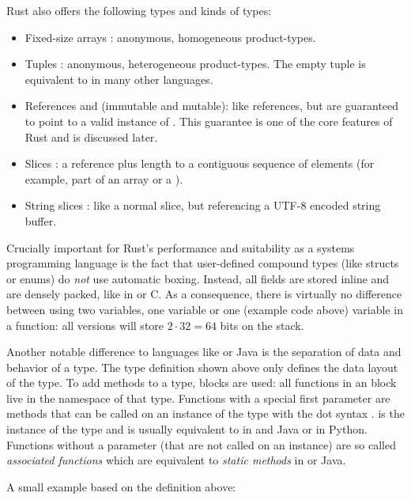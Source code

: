 \newpage
Rust also offers the following types and kinds of types:
\vspace{-3mm}
\begin{itemize}
  \item Fixed-size arrays \code{[T; N]}: anonymous, homogeneous product-types.
  \item Tuples : anonymous, heterogeneous product-types. The empty tuple \code{()} is equivalent to  in many other languages.
  \item References  and  (immutable and mutable): like \cpp references, but are guaranteed to point to a valid instance of .
  This guarantee is one of the core features of Rust and is discussed later.
  \item Slices \code{&[T]}: a reference plus length to a contiguous sequence of elements (for example, part of an array or a ).
  \item String slices : like a normal slice, but referencing a UTF-8 encoded string buffer.
\end{itemize}

Crucially important for Rust's performance and suitability as a systems programming language is the fact that user-defined compound types (like structs or enums) do \emph{not} use automatic boxing.
Instead, all fields are stored inline and are densely packed, like in \cpp or C.
As a consequence, there is virtually no difference between using two  variables, one \code{[f32; 2]} variable or one  (example code above) variable in a function: all versions will store $2 \cdot 32 = 64$ bits on the stack.

Another notable difference to languages like \cpp or Java is the separation of data and behavior of a type.
The type definition shown above only defines the data layout of the type.
To add methods to a type,  blocks are used: all functions in an  block live in the namespace of that type.
Functions with a special first  parameter are methods that can be called on an instance of the type with the dot syntax .
 is the instance of the type and is usually equivalent to  in \cpp and Java or  in Python.
Functions without a  parameter (that are not called on an instance) are so called \emph{associated functions} which are equivalent to \emph{static methods} in \cpp or Java.

A small example based on the  definition above:

